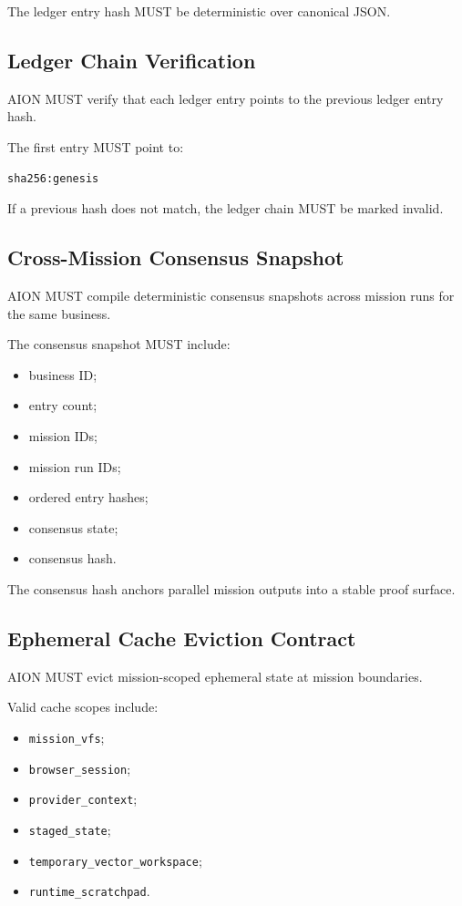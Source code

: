 The ledger entry hash MUST be deterministic over canonical JSON.

\subsection{Ledger Chain Verification}

AION MUST verify that each ledger entry points to the previous ledger entry hash.

The first entry MUST point to:

\begin{verbatim}
sha256:genesis
\end{verbatim}

If a previous hash does not match, the ledger chain MUST be marked invalid.

\subsection{Cross-Mission Consensus Snapshot}

AION MUST compile deterministic consensus snapshots across mission runs for the same business.

The consensus snapshot MUST include:

\begin{itemize}
  \item business ID;
  \item entry count;
  \item mission IDs;
  \item mission run IDs;
  \item ordered entry hashes;
  \item consensus state;
  \item consensus hash.
\end{itemize}

The consensus hash anchors parallel mission outputs into a stable proof surface.

\subsection{Ephemeral Cache Eviction Contract}

AION MUST evict mission-scoped ephemeral state at mission boundaries.

Valid cache scopes include:

\begin{itemize}
  \item \texttt{mission\_vfs};
  \item \texttt{browser\_session};
  \item \texttt{provider\_context};
  \item \texttt{staged\_state};
  \item \texttt{temporary\_vector\_workspace};
  \item \texttt{runtime\_scratchpad}.
\end{itemize}

